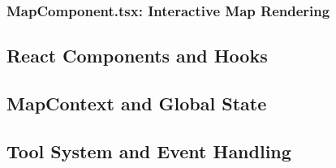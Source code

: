 \subsubsection{MapComponent.tsx: Interactive Map Rendering}


\subsection{React Components and Hooks}

\subsection{MapContext and Global State}

\subsection{Tool System and Event Handling}
